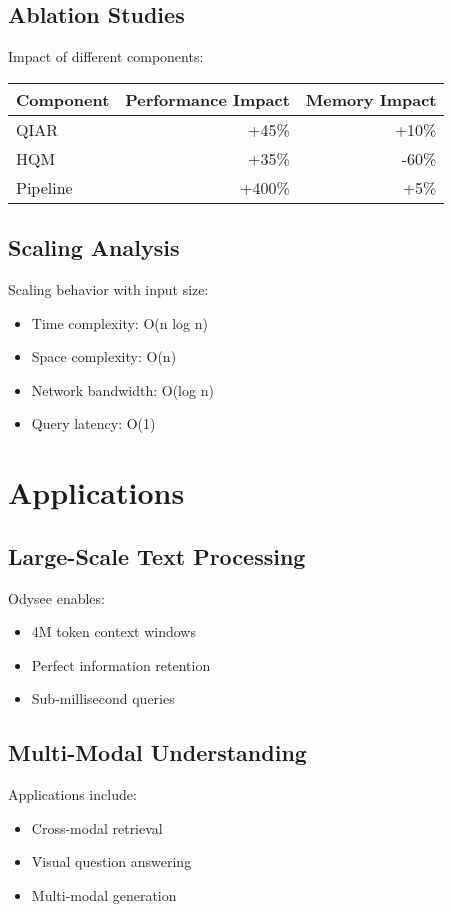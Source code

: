 \documentclass[10pt,twocolumn]{article}
\begin{document}
\subsection{Ablation Studies}
Impact of different components:
\begin{table}[h]
\centering
\begin{tabular}{lrr}
\toprule
Component & Performance Impact & Memory Impact \\
\midrule
QIAR & +45\% & +10\% \\
HQM & +35\% & -60\% \\
Pipeline & +400\% & +5\% \\
\bottomrule
\end{tabular}
\end{table}

\subsection{Scaling Analysis}
Scaling behavior with input size:
\begin{itemize}
    \item Time complexity: O(n log n)
    \item Space complexity: O(n)
    \item Network bandwidth: O(log n)
    \item Query latency: O(1)
\end{itemize}

\section{Applications}
\subsection{Large-Scale Text Processing}
Odysee enables:
\begin{itemize}
    \item 4M token context windows
    \item Perfect information retention
    \item Sub-millisecond queries
\end{itemize}

\subsection{Multi-Modal Understanding}
Applications include:
\begin{itemize}
    \item Cross-modal retrieval
    \item Visual question answering
    \item Multi-modal generation
\end{itemize}
\end{document}
